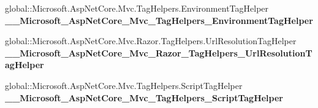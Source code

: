 \begin{DoxyCompactItemize}
global\+::\+Microsoft.\+Asp\+Net\+Core.\+Mvc.\+Tag\+Helpers.\+Environment\+Tag\+Helper {\bfseries \+\_\+\+\_\+\+Microsoft\+\_\+\+Asp\+Net\+Core\+\_\+\+Mvc\+\_\+\+Tag\+Helpers\+\_\+\+Environment\+Tag\+Helper}
\item 
\mbox{\label{class_projeto_e_s_w_1_1_areas_1_1_identity_1_1_pages_1_1_areas___identity___pages_____validation_scripts_partial_a99167ce1924e5bcb8d8dc425a5cf3adc}} 
global\+::\+Microsoft.\+Asp\+Net\+Core.\+Mvc.\+Razor.\+Tag\+Helpers.\+Url\+Resolution\+Tag\+Helper {\bfseries \+\_\+\+\_\+\+Microsoft\+\_\+\+Asp\+Net\+Core\+\_\+\+Mvc\+\_\+\+Razor\+\_\+\+Tag\+Helpers\+\_\+\+Url\+Resolution\+Tag\+Helper}
\item 
\mbox{\label{class_projeto_e_s_w_1_1_areas_1_1_identity_1_1_pages_1_1_areas___identity___pages_____validation_scripts_partial_a76d2854987b52b8d87ba5d853ede0d7a}} 
global\+::\+Microsoft.\+Asp\+Net\+Core.\+Mvc.\+Tag\+Helpers.\+Script\+Tag\+Helper {\bfseries \+\_\+\+\_\+\+Microsoft\+\_\+\+Asp\+Net\+Core\+\_\+\+Mvc\+\_\+\+Tag\+Helpers\+\_\+\+Script\+Tag\+Helper}
\end{DoxyCompactItemize}

